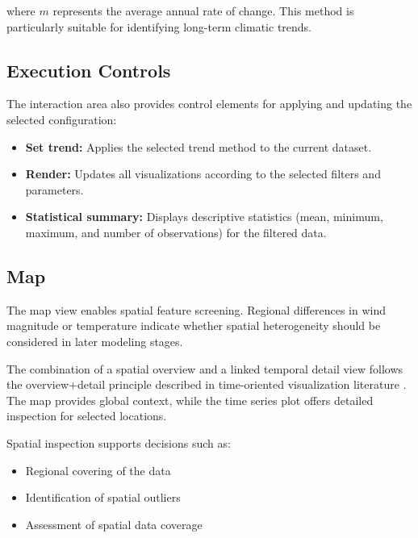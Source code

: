 where $m$ represents the average annual rate of change. 
This method is particularly suitable for identifying long-term climatic trends.

\subsection{Execution Controls}

The interaction area also provides control elements for applying and updating 
the selected configuration:

\begin{itemize}
    \item \textbf{Set trend:} Applies the selected trend method to the current dataset.
    \item \textbf{Render:} Updates all visualizations according to the selected filters and parameters.
    \item \textbf{Statistical summary:} Displays descriptive statistics (mean, minimum, maximum, and number of observations) for the filtered data.
\end{itemize}




\subsection{Map}

The map view enables spatial feature screening. Regional differences in wind magnitude or temperature indicate whether spatial heterogeneity should be considered in later modeling stages.

The combination of a spatial overview and a linked temporal detail view follows the overview+detail principle described in time-oriented visualization literature \parencite[p.380]{aigner_time_oriented_data}. The map provides global context, while the time series plot offers detailed inspection for selected locations.

Spatial inspection supports decisions such as:

\begin{itemize}
    \item Regional covering of the data
    \item Identification of spatial outliers
    \item Assessment of spatial data coverage
\end{itemize}



